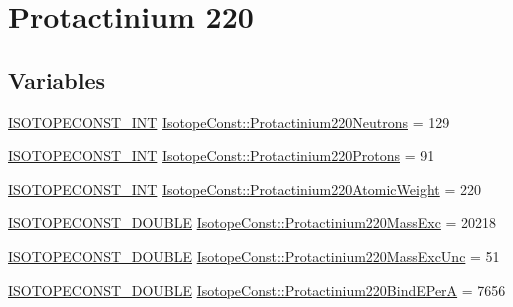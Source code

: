 \hypertarget{group___isotope_const-_protactinium-_pa220}{}\section{Protactinium 220}
\label{group___isotope_const-_protactinium-_pa220}
\subsection*{Variables}
\begin{DoxyCompactItemize}
\item 
\mbox{\hyperlink{group___isotope_const-_macros_ga5f18360b3e99483a35c32d789e62621c}{I\+S\+O\+T\+O\+P\+E\+C\+O\+N\+S\+T\+\_\+\+I\+NT}} \mbox{\hyperlink{group___isotope_const-_protactinium-_pa220_ga913088f737c8c0113b7198ea8bbe7849}{Isotope\+Const\+::\+Protactinium220\+Neutrons}} = 129
\item 
\mbox{\hyperlink{group___isotope_const-_macros_ga5f18360b3e99483a35c32d789e62621c}{I\+S\+O\+T\+O\+P\+E\+C\+O\+N\+S\+T\+\_\+\+I\+NT}} \mbox{\hyperlink{group___isotope_const-_protactinium-_pa220_ga5d95e3497ab9daedd2dfd6dd506f839e}{Isotope\+Const\+::\+Protactinium220\+Protons}} = 91
\item 
\mbox{\hyperlink{group___isotope_const-_macros_ga5f18360b3e99483a35c32d789e62621c}{I\+S\+O\+T\+O\+P\+E\+C\+O\+N\+S\+T\+\_\+\+I\+NT}} \mbox{\hyperlink{group___isotope_const-_protactinium-_pa220_ga6baff025b83635dda0ffeaa277472b50}{Isotope\+Const\+::\+Protactinium220\+Atomic\+Weight}} = 220
\item 
\mbox{\hyperlink{group___isotope_const-_macros_ga8f45a7272ce02c0b4c65c44636ed719a}{I\+S\+O\+T\+O\+P\+E\+C\+O\+N\+S\+T\+\_\+\+D\+O\+U\+B\+LE}} \mbox{\hyperlink{group___isotope_const-_protactinium-_pa220_ga78c223410145bb83452191a119e3c8e6}{Isotope\+Const\+::\+Protactinium220\+Mass\+Exc}} = 20218
\item 
\mbox{\hyperlink{group___isotope_const-_macros_ga8f45a7272ce02c0b4c65c44636ed719a}{I\+S\+O\+T\+O\+P\+E\+C\+O\+N\+S\+T\+\_\+\+D\+O\+U\+B\+LE}} \mbox{\hyperlink{group___isotope_const-_protactinium-_pa220_gab87e4040067429c7102415791b44a8c7}{Isotope\+Const\+::\+Protactinium220\+Mass\+Exc\+Unc}} = 51
\item 
\mbox{\hyperlink{group___isotope_const-_macros_ga8f45a7272ce02c0b4c65c44636ed719a}{I\+S\+O\+T\+O\+P\+E\+C\+O\+N\+S\+T\+\_\+\+D\+O\+U\+B\+LE}} \mbox{\hyperlink{group___isotope_const-_protactinium-_pa220_ga51b502dcd3128c365352177bae7dabcb}{Isotope\+Const\+::\+Protactinium220\+Bind\+E\+PerA}} = 7656

\end{DoxyCompactItemize}
